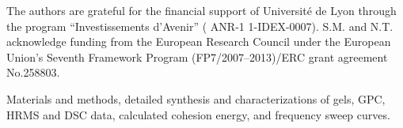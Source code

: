 \documentclass[journal=jacsat,manuscript=article]{achemso}
\begin{document}
\begin{acknowledgement}
The authors are grateful for the financial support of Université de Lyon through the program ``Investissements d'Avenir'' ( ANR-1 1-IDEX-0007). S.M. and N.T. acknowledge funding from the European Research Council under the European Union's Seventh Framework Program (FP7/2007–2013)/ERC grant agreement No.258803.
\end{acknowledgement}

\begin{suppinfo}

Materials and methods, detailed synthesis and characterizations of gels, GPC, HRMS and DSC data, calculated cohesion energy, and frequency sweep curves.

\end{suppinfo}
\end{document}
